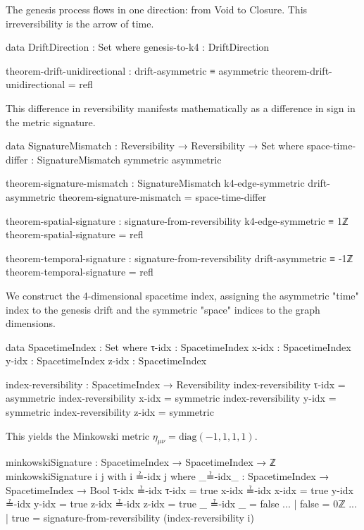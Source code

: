 \documentclass[11pt,a4paper]{book}
\begin{document}
The genesis process flows in one direction: from Void to Closure. This irreversibility is the arrow of time.

\begin{code}
data DriftDirection : Set where
  genesis-to-k4 : DriftDirection

theorem-drift-unidirectional : drift-asymmetric ≡ asymmetric
theorem-drift-unidirectional = refl
\end{code}

This difference in reversibility manifests mathematically as a difference in sign in the metric signature.

\begin{code}
data SignatureMismatch : Reversibility → Reversibility → Set where
  space-time-differ : SignatureMismatch symmetric asymmetric

theorem-signature-mismatch : SignatureMismatch k4-edge-symmetric drift-asymmetric
theorem-signature-mismatch = space-time-differ
\end{code}

\begin{code}
theorem-spatial-signature : signature-from-reversibility k4-edge-symmetric ≡ 1ℤ
theorem-spatial-signature = refl

theorem-temporal-signature : signature-from-reversibility drift-asymmetric ≡ -1ℤ
theorem-temporal-signature = refl
\end{code}

We construct the 4-dimensional spacetime index, assigning the asymmetric "time" index to the genesis drift and the symmetric "space" indices to the graph dimensions.

\begin{code}
data SpacetimeIndex : Set where
  τ-idx : SpacetimeIndex
  x-idx : SpacetimeIndex
  y-idx : SpacetimeIndex
  z-idx : SpacetimeIndex

index-reversibility : SpacetimeIndex → Reversibility
index-reversibility τ-idx = asymmetric
index-reversibility x-idx = symmetric
index-reversibility y-idx = symmetric
index-reversibility z-idx = symmetric
\end{code}

This yields the Minkowski metric $\eta_{\mu\nu} = \text{diag}(-1, 1, 1, 1)$.

\begin{code}
minkowskiSignature : SpacetimeIndex → SpacetimeIndex → ℤ
minkowskiSignature i j with i ≟-idx j
  where
    _≟-idx_ : SpacetimeIndex → SpacetimeIndex → Bool
    τ-idx ≟-idx τ-idx = true
    x-idx ≟-idx x-idx = true
    y-idx ≟-idx y-idx = true
    z-idx ≟-idx z-idx = true
    _     ≟-idx _     = false
... | false = 0ℤ
... | true  = signature-from-reversibility (index-reversibility i)
\end{code}
\end{document}
